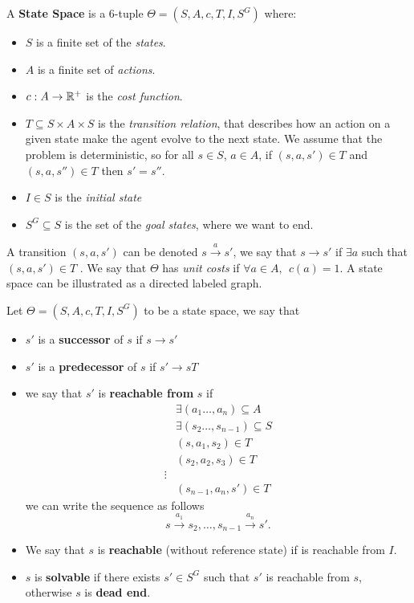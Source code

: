 \documentclass[10pt, letterpaper]{report}
\begin{document}
\begin{definition}
    A \textbf{State Space} is a 6-tuple $\Theta=(S,A,c,T,I,S^G)$ where:\begin{itemize}
        \item $S$ is a finite set of the \textit{states}.
        \item $A$ is a finite set of \textit{actions}.
        \item $c:A\rightarrow{\mathbb R}^+$ is the \textit{cost function}.
        \item $T\subseteq S\times A\times S $ is the \textit{transition relation}, that describes how an action on a given state make the agent evolve to the next state. We assume that the problem is deterministic, so for all $s\in S$, $a\in A$, if $(s,a,s')\in T$ and $(s,a,s'')\in T$ then $s'=s''$.
        \item $I\in S$ is the \textit{initial state}
        \item $S^G\subseteq S$ is the set of the \textit{goal states}, where we want to end.
    \end{itemize}
\end{definition}
A transition $(s,a,s')$ can be denoted $s \xrightarrow{a} s'$, we say that $s\rightarrow s'$ if $\exists a$ such that $(s,a,s')\in T$ . We say that $\Theta$ has \textit{unit costs} if $\forall a\in A, \ \ c(a)=1$. A state space can be illustrated as a directed labeled graph. \begin{definition}
    Let $\Theta=(S,A,c,T,I,S^G)$ to be a state space, we say that\begin{itemize}
        \item $s'$ is a \textbf{successor} of $s$ if $s\rightarrow s'$
        \item $s'$ is a \textbf{predecessor} of $s$ if $s'\rightarrow sT$
        \item we say that $s'$ is \textbf{reachable from} $s$ if\begin{align}
            &\exists (a_1\dots, a_n)\subseteq A\\
            &\exists (s_2\dots, s_{n-1})\subseteq S\\
            &(s,a_1,s_2)\in T\\
            &(s_2,a_2,s_3)\in T\\
            \vdots \\
            &(s_{n-1},a_n,s')\in T 
        \end{align}
        we can write the sequence as follows\begin{equation}
            s\xrightarrow{a_1}s_2,\dots, s_{n-1}\xrightarrow{a_n}s'.
        \end{equation}
        \item We say that $s$ is \textbf{reachable} (without reference state) if is reachable from $I$.
        \item $s$ is \textbf{solvable} if there exists $s'\in S^G$ such that $s'$ is reachable from $s$, otherwise $s$ is \textbf{dead end}.
    \end{itemize}
\end{definition}
\end{document}
